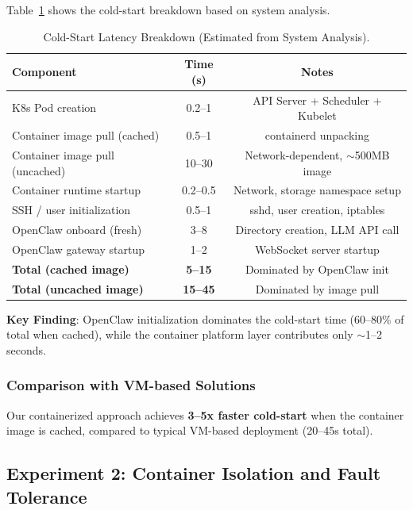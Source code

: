 Table~\ref{tab:cold_start} shows the cold-start breakdown based on system analysis.

\begin{table}[htbp]
    \centering
    \caption{Cold-Start Latency Breakdown (Estimated from System Analysis).}
    \label{tab:cold_start}
    \begin{tabular}{@{}lcc@{}}
        \toprule
        \textbf{Component} & \textbf{Time (s)} & \textbf{Notes} \\
        \midrule
        K8s Pod creation & 0.2--1 & API Server + Scheduler + Kubelet \\
        Container image pull (cached) & 0.5--1 & containerd unpacking \\
        Container image pull (uncached) & 10--30 & Network-dependent, $\sim$500MB image \\
        Container runtime startup & 0.2--0.5 & Network, storage namespace setup \\
        SSH / user initialization & 0.5--1 & sshd, user creation, iptables \\
        OpenClaw onboard (fresh) & 3--8 & Directory creation, LLM API call \\
        OpenClaw gateway startup & 1--2 & WebSocket server startup \\
        \midrule
        \textbf{Total (cached image)} & \textbf{5--15} & Dominated by OpenClaw init \\
        \textbf{Total (uncached image)} & \textbf{15--45} & Dominated by image pull \\
        \bottomrule
    \end{tabular}
\end{table}

\textbf{Key Finding}: OpenClaw initialization dominates the cold-start time (60--80\% of total when cached), while the container platform layer contributes only $\sim$1--2 seconds.

\subsubsection{Comparison with VM-based Solutions}
Our containerized approach achieves \textbf{3--5x faster cold-start} when the container image is cached, compared to typical VM-based deployment (20--45s total).

\subsection{Experiment 2: Container Isolation and Fault Tolerance}

